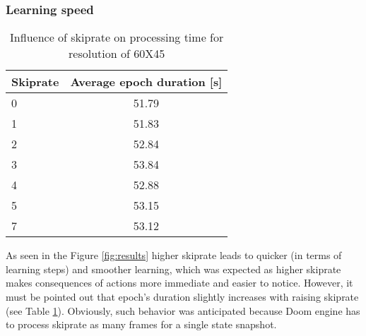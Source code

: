 		\subsubsection*{Learning speed} 
			\begin{table}
				\begin{center}
					\begin{tabular}{ |l | c |}
						\hline
						Skiprate & Average epoch duration [s] \\ \hline
						0 & 51.79 \\ \hline
						1 & 51.83 \\ \hline
						2 & 52.84 \\ \hline
						3 & 53.84 \\ \hline
						4 & 52.88 \\ \hline
						5 & 53.15 \\ \hline
						7 & 53.12 \\ \hline
					\end{tabular}
				\end{center}
				\caption{Influence of skiprate on processing time for resolution of 60X45}\label{tab:time_results}
			\end{table}
			As seen in the Figure \ref{fig:results} higher skiprate leads to quicker (in terms of learning steps) and smoother learning, which was expected as higher skiprate makes consequences of actions more immediate and easier to notice. However, it must be pointed out that epoch's duration slightly increases with raising skiprate (see Table \ref{tab:time_results}). Obviously, such behavior was anticipated because Doom engine has to process skiprate as many frames for a single state snapshot.

